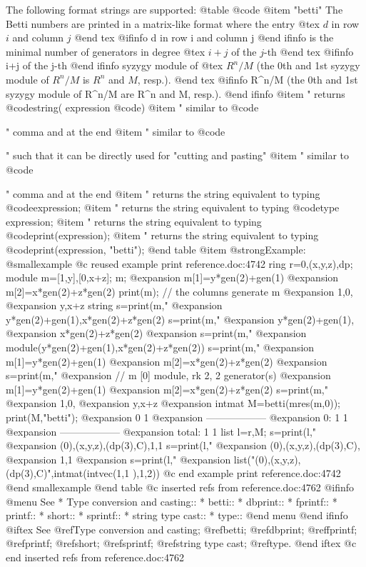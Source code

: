 {{The following format strings are supported:
@table @code
@item "betti"
The Betti numbers are printed in a matrix-like format where the entry
@tex
$d$ in row $i$ and column $j$
@end tex
@ifinfo
d in row i and column j
@end ifinfo
is the minimal number of generators in
degree
@tex
$i+j$ of the $j$-th
@end tex
@ifinfo
i+j of the j-th
@end ifinfo
 syzygy module of
@tex
$R^n/M$ (the 0th and 1st syzygy module of $R^n/M$ is $R^n$ and $M$, resp.).
@end tex
@ifinfo
R^n/M (the 0th and 1st syzygy module of R^n/M are R^n and M, resp.).
@end ifinfo
@item "%
returns @code{string(} expression @code{)}
@item "%
similar to @code{"%
comma and at the end
@item "%
similar to @code{"%
such that it can be directly used for "cutting and pasting"
@item "%
similar to @code{"%
comma and at the end
@item "%
returns the string equivalent to typing @code{expression;}
@item "%
returns the string equivalent to typing @code{type expression;}
@item "%
returns the string equivalent to typing @code{print(expression);}
@item "%
returns the string equivalent to typing @code{print(expression, "betti");}
@end table
@item @strong{Example:}
@smallexample
@c reused example print reference.doc:4742 
  ring r=0,(x,y,z),dp;
  module m=[1,y],[0,x+z];
  m;
@expansion{} m[1]=y*gen(2)+gen(1)
@expansion{} m[2]=x*gen(2)+z*gen(2)
  print(m);  // the columns generate m
@expansion{} 1,0, 
@expansion{} y,x+z
  string s=print(m,"%
@expansion{} y*gen(2)+gen(1),x*gen(2)+z*gen(2)
  s=print(m,"%
@expansion{} y*gen(2)+gen(1),
@expansion{} x*gen(2)+z*gen(2)
@expansion{} 
  s=print(m,"%
@expansion{} module(y*gen(2)+gen(1),x*gen(2)+z*gen(2))
  s=print(m,"%
@expansion{} m[1]=y*gen(2)+gen(1)
@expansion{} m[2]=x*gen(2)+z*gen(2)
@expansion{} 
  s=print(m,"%
@expansion{} // m                    [0]  module, rk 2, 2 generator(s)
@expansion{} m[1]=y*gen(2)+gen(1)
@expansion{} m[2]=x*gen(2)+z*gen(2)
  s=print(m,"%
@expansion{} 1,0, 
@expansion{} y,x+z
@expansion{} 
  intmat M=betti(mres(m,0));
  print(M,"betti");
@expansion{}            0     1
@expansion{} ------------------
@expansion{}     0:     1     1
@expansion{} ------------------
@expansion{} total:     1     1
  list l=r,M;
  s=print(l,"%
@expansion{} (0),(x,y,z),(dp(3),C),1,1 
  s=print(l,"%
@expansion{} (0),(x,y,z),(dp(3),C),
@expansion{} 1,1 
@expansion{} 
  s=print(l,"%
@expansion{} list("(0),(x,y,z),(dp(3),C)",intmat(intvec(1,1 ),1,2))
@c end example print reference.doc:4742
@end smallexample
@end table
@c inserted refs from reference.doc:4762
@ifinfo
@menu
See
* Type conversion and casting::
* betti::
* dbprint::
* fprintf::
* printf::
* short::
* sprintf::
* string type cast::
* type::
@end menu
@end ifinfo
@iftex
See
@ref{Type conversion and casting};
@ref{betti};
@ref{dbprint};
@ref{fprintf};
@ref{printf};
@ref{short};
@ref{sprintf};
@ref{string type cast};
@ref{type}.
@end iftex
@c end inserted refs from reference.doc:4762

}}}}}
